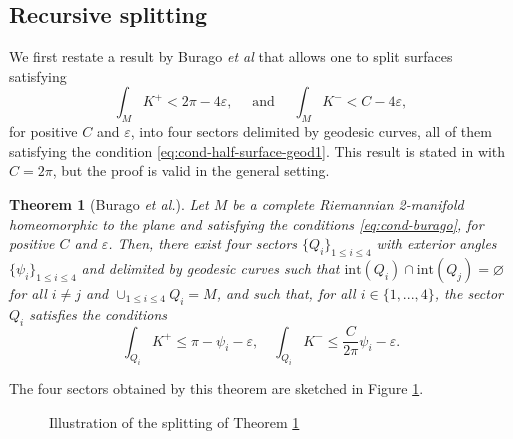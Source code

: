 \documentclass{article}
\newcommand{\RR}{\mathcal{R}}
\newcommand{\R}{\mathbb{R}}
\newcommand{\surf}{M}
\newcommand{\sect}{Q}
\newtheorem{theorem}{Theorem}
\theoremstyle{remark}
\theoremstyle{prpart}
\begin{document}
\subsection{Recursive splitting}\label{subsubsec:rec-split}
We first restate a result by Burago \textit{et al} \cite[Theorem 3]{Bur05} that allows one to split surfaces satisfying
\begin{equation}    \label{eq:cond-burago}
  \int_\surf K^+ < 2\pi - 4\varepsilon,\quad\text{ and }\quad \int_\surf K^- < C-4\varepsilon,
\end{equation}
for positive $C$ and $\varepsilon$, into four sectors delimited by geodesic curves, all of them satisfying the condition \eqref{eq:cond-half-surface-geod1}. This result is stated in \cite{Bur05} with $C=2\pi$, but the proof is valid in the general setting. 
\begin{theorem}[Burago {\it et al.}]\label{thm:burago}
    Let $\surf$ be a complete Riemannian 2-manifold homeomorphic to the plane and satisfying the conditions \eqref{eq:cond-burago}, for positive $C$ and $\varepsilon$. Then, there exist four sectors $\{\sect_i\}_{1\leq i\leq 4}$ with exterior angles $\{\psi_i\}_{1\leq i\leq 4}$ and delimited by geodesic curves such that $\text{int}(\sect_i)\cap \text{int}(\sect_j) = \varnothing$ for all $i \neq j$ and $\cup_{1\leq i\leq 4} \sect_i = \surf$, and such that, for all $i\in\{1,...,4\}$, the sector $\sect_i$ satisfies the conditions
\begin{equation}\label{eq:res-burago}
\int_{\sect_i} K^+ \leq \pi - \psi_i-\varepsilon,\quad \int_{\sect_i} K^- \leq \frac{C}{2\pi}\psi_i-\varepsilon.
\end{equation}
\end{theorem}
The four sectors obtained by this theorem are sketched in Figure \ref{fig:scheme-thm-burago}.
\begin{figure}[!htp]
  \centering
  \caption{Illustration of the splitting of Theorem \ref{thm:burago}}  \label{fig:scheme-thm-burago}
\end{figure}
\end{document}
